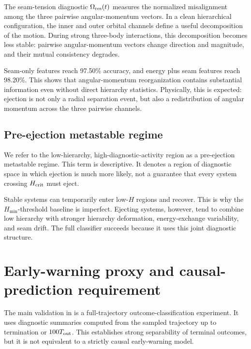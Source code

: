 \documentclass[12pt,a4paper]{article}
\newcommand{\Hcrit}{H_{\rm crit}}
\newcommand{\Hmin}{H_{\min}}
\newcommand{\Ores}{\Omega_{\rm res}}
\newcommand{\Tout}{T_{\rm out}}
\begin{document}
The seam-tension diagnostic \(\Ores(t)\) measures the normalized misalignment among the three pairwise angular-momentum vectors. In a clean hierarchical configuration, the inner and outer orbital channels define a useful decomposition of the motion. During strong three-body interactions, this decomposition becomes less stable: pairwise angular-momentum vectors change direction and magnitude, and their mutual consistency degrades.

Seam-only features reach 97.50\% accuracy, and energy plus seam features reach 98.20\%. This shows that angular-momentum reorganization contains substantial information even without direct hierarchy statistics. Physically, this is expected: ejection is not only a radial separation event, but also a redistribution of angular momentum across the three pairwise channels.

\subsection{Pre-ejection metastable regime}
\label{sec:pre_ejection_metastable}

We refer to the low-hierarchy, high-diagnostic-activity region as a pre-ejection metastable regime. This term is descriptive. It denotes a region of diagnostic space in which ejection is much more likely, not a guarantee that every system crossing \(\Hcrit\) must eject.

Stable systems can temporarily enter low-\(H\) regions and recover. This is why the \(\Hmin\)-threshold baseline is imperfect. Ejecting systems, however, tend to combine low hierarchy with stronger hierarchy deformation, energy-exchange variability, and seam drift. The full classifier succeeds because it uses this joint diagnostic structure.

\section{Early-warning proxy and causal-prediction requirement}
\label{sec:early_warning}

The main validation in  is a full-trajectory outcome-classification experiment. It uses diagnostic summaries computed from the sampled trajectory up to termination or \(100\Tout\). This establishes strong separability of terminal outcomes, but it is not equivalent to a strictly causal early-warning model.
\end{document}

